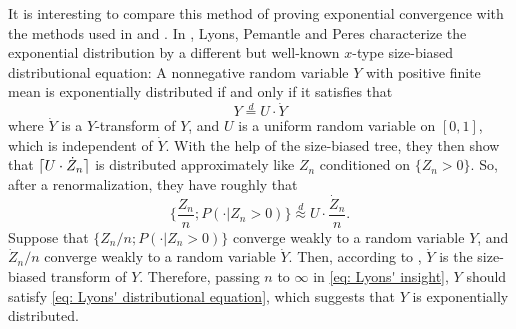 \documentclass[12pt,a4paper]{amsart}
\DeclarePairedDelimiter\ceil{\lceil}{\rceil}
\numberwithin{equation}{section}
\begin{document}
	It is interesting to compare this method of proving exponential convergence with the methods 
	used in \cite{geiger2000new} and \cite{lyons1995conceptual}.
	In \cite{lyons1995conceptual}, Lyons, Pemantle and Peres characterize the exponential distribution by a different
but well-known $x$-type size-biased distributional equation:
	A nonnegative random variable $Y$ with positive finite mean is exponentially distributed if and only if it satisfies that
\begin{equation}
\label{eq: Lyons' distributional equation}
		Y 		\overset{d}= U \cdot \dot Y
\end{equation}
   where $\dot Y$ is a $Y$-transform of $Y$,  and $U$ is a uniform random variable on
$[0,1]$, which is independent of $\dot Y$.
    With the help of the size-biased tree, they then show that $\ceil{U \cdot \dot Z_n}$ is distributed approximately like $Z_n$ conditioned on $\{Z_n > 0\}$.
	So, after a renormalization, they have roughly that
\begin{equation}
\label{eq: Lyons' insight}
	\Big\{\frac{Z_n}{n} ; P(  \cdot| Z_n > 0) \Big\}
	\overset{d}{\approx} U \cdot \frac{ \dot Z_n}{n}.
\end{equation}
	Suppose that $\{Z_n/n; P(\cdot | Z_n > 0)\}$ converge weakly to a random variable $Y$, and $\dot Z_n /n$ converge weakly to a random variable $\dot Y$.
	Then, according to \cite[Lemma 4.3]{lyons1995conceptual}, $\dot Y$ is the size-biased transform of $Y$.
	Therefore, passing $n$ to $\infty$ in \eqref{eq: Lyons' insight}, $Y$ should satisfy \eqref{eq: Lyons' distributional equation}, which suggests that $Y$ is exponentially distributed.
	
\end{document}
